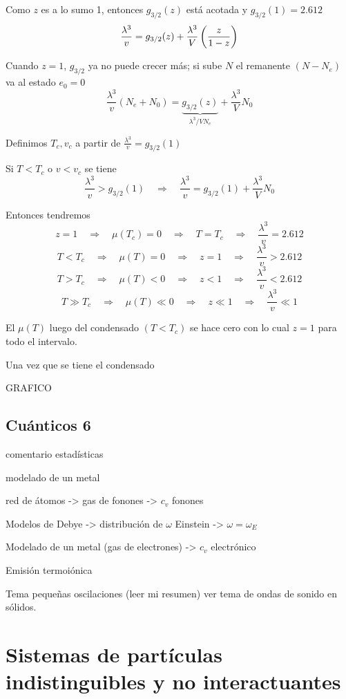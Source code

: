 \documentclass[10pt,oneside]{CBFT_book}
\begin{document}
Como $z$ es a lo sumo 1, entonces $g_{3/2}(z)$ está acotada y $g_{3/2}(1)=2.612$
\[
	\frac{\lambda^3}{v} = g_{3/2}(z) + \frac{\lambda^3}{V} \left( \frac{ z }{ 1-z } \right)
\]

Cuando $z=1$, $g_{3/2}$  ya no puede crecer más; si sube $N$ el remanente $(N-N_e)$ va al estado 
$e_0=0$
\[
	\frac{\lambda^3}{v}(N_e+N_0) = \underbrace{g_{3/2}(z)}_{\lambda^3/V N_e} + \frac{\lambda^3}{V} N_0
\]

Definimos $T_c, v_c$ a partir de $\frac{\lambda^3}{v} = g_{3/2}(1)$ 

Si $ T<T_c$ o $v<v_c$ se tiene 
\[
	\frac{\lambda^3}{v} > g_{3/2}(1) \quad \Rightarrow \quad \frac{\lambda^3}{v} =
	g_{3/2}(1) + \frac{\lambda^3}{V} N_0
\]

Entonces tendremos 
\[
	z = 1 \quad \Rightarrow \quad \mu(T_c) = 0 \quad \Rightarrow \quad T=T_c \quad \Rightarrow \quad  
	\frac{\lambda^3}{v} = 2.612
\]
\[
	T < T_c \quad \Rightarrow \quad \mu(T) = 0 \quad \Rightarrow \quad z = 1 \quad \Rightarrow \quad  
	\frac{\lambda^3}{v} > 2.612
\]
\[
	T > T_c \quad \Rightarrow \quad \mu(T) < 0 \quad \Rightarrow \quad z < 1 \quad \Rightarrow \quad  
	\frac{\lambda^3}{v} < 2.612
\]
\[
	T \gg T_c \quad \Rightarrow \quad \mu(T) \ll 0 \quad \Rightarrow \quad z \ll 1 \quad \Rightarrow \quad  
	\frac{\lambda^3}{v} \ll 1
\]

El $\mu(T)$ luego del condensado $(T<T_c)$ se hace cero con lo cual $z=1$ para todo el intervalo.

Una vez que se tiene el condensado

GRAFICO

\subsection{Cuánticos 6}

comentario estadísticas

modelado de un metal

red de átomos -> gas de fonones -> $c_v$ fonones

Modelos de Debye -> distribución de $\omega$
Einstein -> $\omega = \omega_E$

Modelado de un metal (gas de electrones) -> $c_v$ electrónico

Emisión termoiónica

Tema pequeñas oscilaciones (leer mi resumen)
ver tema de ondas de sonido en sólidos.


\section{Sistemas de partículas indistinguibles y no interactuantes}
\end{document}
